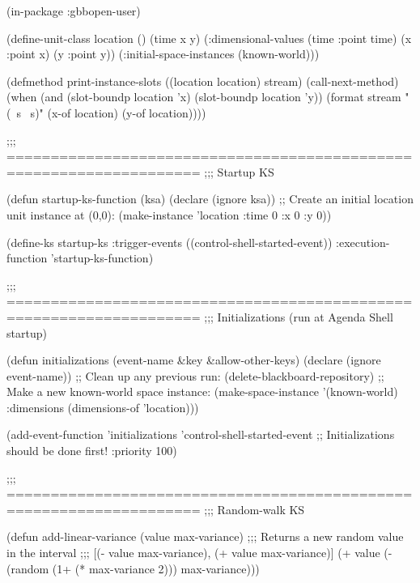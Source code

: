 \documentclass[10pt,twoside,english,pdftex]{article}
\begin{document}
\begin{example}
 (in-package :gbbopen-user)

  (define-unit-class location ()
    (time 
     x y)
    (:dimensional-values
      (time :point time)
      (x :point x)
      (y :point y))
    (:initial-space-instances (known-world)))

  (defmethod print-instance-slots ((location location) stream)
    (call-next-method)
    (when (and (slot-boundp location 'x)
               (slot-boundp location 'y))
      (format stream " (~s ~s)"
              (x-of location)
              (y-of location))))

  ;;; ====================================================================
  ;;;   Startup KS

  (defun startup-ks-function (ksa)
    (declare (ignore ksa))
    ;; Create an initial location unit instance at (0,0):
    (make-instance 'location :time 0 :x 0 :y 0))

  (define-ks startup-ks
      :trigger-events ((control-shell-started-event))
      :execution-function 'startup-ks-function)

  ;;; ====================================================================
  ;;;   Initializations (run at Agenda Shell startup)

  (defun initializations (event-name &key &allow-other-keys)
    (declare (ignore event-name))
    ;; Clean up any previous run:
    (delete-blackboard-repository)
    ;; Make a new known-world space instance:
    (make-space-instance 
     '(known-world)
     :dimensions (dimensions-of 'location)))

  (add-event-function 'initializations 'control-shell-started-event
                      ;; Initializations should be done first!
                      :priority 100)

  ;;; ====================================================================
  ;;;   Random-walk KS

  (defun add-linear-variance (value max-variance)
    ;;; Returns a new random value in the interval
    ;;; [(- value max-variance), (+ value max-variance)]
    (+ value (- (random (1+ (* max-variance 2))) max-variance)))


\end{example}
\end{document}
